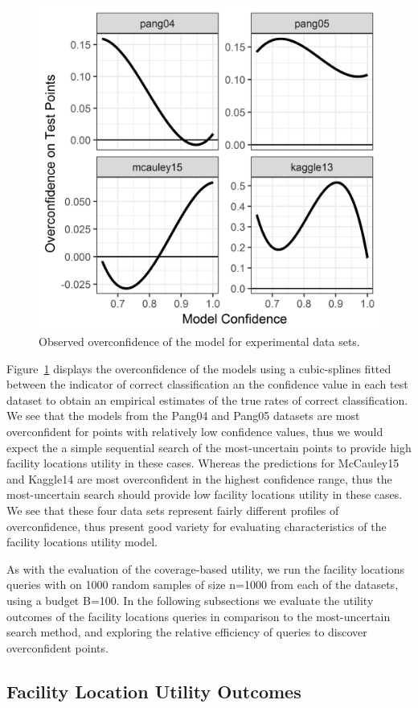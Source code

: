 \documentclass[letterpaper]{article} %
\newcommand{\km}[1]{{\color{red} #1}} %
\begin{document}
\begin{figure}[hbtp]
  \includegraphics[width=.45\textwidth]{../experimentsAndPlots/overconfidence.png}
  \caption{Observed overconfidence of the model for experimental data sets.}
  \label{fig:overconf}
\end{figure}

Figure~\ref{fig:overconf} displays the overconfidence of the models using a cubic-splines fitted between the indicator of correct classification an the confidence value in each test dataset to obtain an empirical estimates of the true rates of correct classification. We see that the models from the Pang04 and Pang05 datasets are most overconfident for points with relatively low confidence values, thus we would expect the a simple sequential search of the most-uncertain points to provide high facility locations utility in these cases. Whereas the predictions for McCauley15 and Kaggle14 are most overconfident in the highest confidence range, thus the most-uncertain search should provide low facility locations utility in these cases. We see that these four data sets represent fairly different profiles of overconfidence, thus present good variety for evaluating characteristics of the facility locations utility model. 

\km{As with the evaluation of the coverage-based utility, we run the facility locations queries with on 1000 random samples of size n=1000 from each of the datasets, using a budget B=100. In the following subsections we evaluate the utility outcomes of the facility locations queries in comparison to the most-uncertain search method, and exploring the relative efficiency of queries to discover overconfident points.}

\subsection{Facility Location Utility Outcomes}
\end{document}
